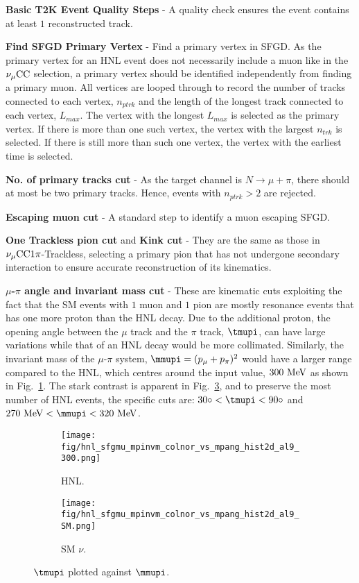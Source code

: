         \textbf{Basic T2K Event Quality Steps} - A quality check ensures the event contains at least $1$ reconstructed track.

        \textbf{Find SFGD Primary Vertex} - Find a primary vertex in SFGD. 
        As the primary vertex for an HNL event does not necessarily include a muon like in the $\nu_{\mu}\textrm{CC}$ selection, a primary vertex should be identified independently from finding a primary muon. 
        All vertices are looped through to record the number of tracks connected to each vertex, $n_{ptrk}$ and the length of the longest track connected to each vertex, $L_{max}$. 
        The vertex with the longest $L_{max}$ is selected as the primary vertex. 
        If there is more than one such vertex, the vertex with the largest $n_{trk}$ is selected. 
        If there is still more than such one vertex, the vertex with the earliest time is selected.

        \textbf{No. of primary tracks cut} - As the target channel is $N\rightarrow\mu+\pi$, there should at most be two primary tracks. Hence, events with $n_{ptrk}>2$ are rejected.

        \textbf{Escaping muon cut} - A standard step to identify a muon escaping SFGD.

        \textbf{One Trackless pion cut} and \textbf{Kink cut} - They are the same as those in $\nu_{\mu}\textrm{CC}1\pi$-Trackless, selecting a primary pion that has not undergone secondary interaction to ensure accurate reconstruction of its kinematics.

        \textbf{$\mu$-$\pi$ angle and invariant mass cut} - These are kinematic cuts exploiting the fact that the SM events with $1$ muon and $1$ pion are mostly resonance events that has one more proton than the HNL decay. 
        Due to the additional proton, the opening angle between the $\mu$ track and the $\pi$ track, $\tmupi$, can have large variations while that of an HNL decay would be more collimated. 
        Similarly, the invariant mass of the $\mu$-$\pi$ system, $\mmupi=(\pmu+\ppi)^2$ would have a larger range compared to the HNL, which centres around the input value, $300~\textrm{MeV}$ as shown in Fig.~\ref{fig:hnl-mmupi}.
        The stark contrast is apparent in Fig.~\ref{fig:mmupi-mupiang}, and to preserve the most number of HNL events, the specific cuts are: $30\degree<\tmupi<90\degree$ and $270~\mev<\mmupi<320~\mev$. 
        \begin{figure}[!htb]
           \centering
           \begin{subfigure}{0.45\textwidth}
                \texttt{[image: fig/hnl\_sfgmu\_mpinvm\_colnor\_vs\_mpang\_hist2d\_al9\_300.png]}
                \caption{HNL.}
                \label{fig:hnl-mmupi}
           \end{subfigure}
           \begin{subfigure}{0.45\textwidth}
                \texttt{[image: fig/hnl\_sfgmu\_mpinvm\_colnor\_vs\_mpang\_hist2d\_al9\_SM.png]}
                \caption{SM $\nu$.}
                \label{fig:sm-mmupi}
           \end{subfigure}
           \caption{$\tmupi$ plotted against $\mmupi$.}
           \label{fig:mmupi-mupiang}
        \end{figure}

